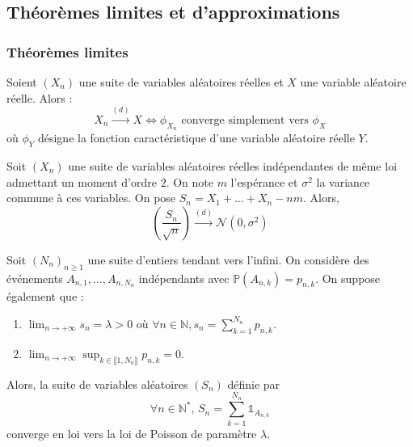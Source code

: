   \subsection{Théorèmes limites et d'approximations}

  \subsubsection{Théorèmes limites}


  \begin{theorem}
    Soient $(X_n)$ une suite de variables aléatoires réelles et $X$ une variable aléatoire réelle. Alors :
    \[ X_n \overset{(d)}{\longrightarrow} X \iff \phi_{X_n} \text{ converge simplement vers } \phi_X \]
    où $\phi_Y$ désigne la fonction caractéristique d'une variable aléatoire réelle $Y$.
  \end{theorem}


  \begin{theorem}
    Soit $(X_n)$ une suite de variables aléatoires réelles indépendantes de même loi admettant un moment d'ordre $2$. On note $m$ l'espérance et $\sigma^2$ la variance commune à ces variables. On pose $S_n = X_1 + \dots + X_n - nm$. Alors,
    \[ \left ( \frac{S_n}{\sqrt{n}} \right) \overset{(d)}{\longrightarrow} \mathcal{N}(0, \sigma^2) \]
  \end{theorem}


  \begin{application}
    Soit $(N_n)_{n \geq 1}$ une suite d'entiers tendant vers l'infini. On considère des événements $A_{n,1}, \dots, A_{n,N_n}$ indépendants avec $\mathbb{P}(A_{n,k}) = p_{n,k}$. On suppose également que :
    \begin{enumerate}[label={\bfseries(\roman*)}]
      \item $\lim_{n \rightarrow +\infty} s_n = \lambda > 0$ où $\forall n \in \mathbb{N}, s_n = \sum_{k=1}^{N_n} p_{n,k}$.
      \item $\lim_{n \rightarrow +\infty} \sup_{k \in \llbracket 1, N_n \rrbracket} p_{n,k} = 0$.
    \end{enumerate}
    Alors, la suite de variables aléatoires $(S_n)$ définie par
    \[ \forall n \in \mathbb{N}^*, \, S_n = \sum_{k=1}^{N_n} \mathbb{1}_{A_{n,k}} \]
    converge en loi vers la loi de Poisson de paramètre $\lambda$.
  \end{application}

